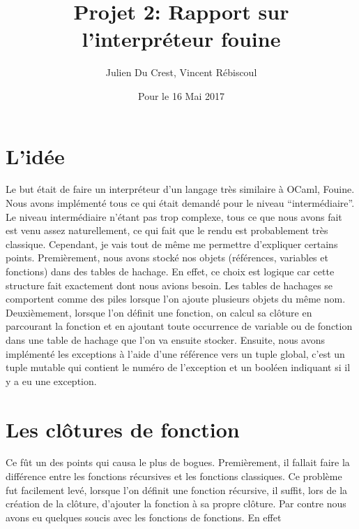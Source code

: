 \documentclass[10pt,a4paper]{article}
\title{Projet 2: Rapport sur l'interpréteur fouine}
\author{Julien Du Crest, Vincent Rébiscoul}
\date{Pour le 16 Mai 2017}
\begin{document}
\maketitle

\section{L'idée}
Le but était de faire un interpréteur d'un langage très similaire à OCaml, Fouine. Nous avons implémenté tous ce qui était demandé pour le niveau ``intermédiaire''. Le niveau intermédiaire n'étant pas trop complexe, tous ce que nous avons fait est venu assez naturellement, ce qui fait que le rendu est probablement très classique. Cependant, je vais tout de même me permettre d'expliquer certains points. Premièrement, nous avons stocké nos objets (références, variables et fonctions) dans des tables de hachage. En effet, ce choix est logique car cette structure fait exactement dont nous avions besoin. Les tables de hachages se comportent comme des piles lorsque l'on ajoute plusieurs objets du même nom. Deuxièmement, lorsque l'on définit une fonction, on calcul sa clôture en parcourant la fonction et en ajoutant toute occurrence de variable ou de fonction dans une table de hachage que l'on va ensuite stocker. Ensuite, nous avons implémenté les exceptions à l'aide d'une référence vers un tuple global, c'est un tuple mutable qui contient le numéro de l'exception et un booléen indiquant si il y a eu une exception. 



\section{Les clôtures de fonction}
Ce fût un des points qui causa le plus de bogues. Premièrement, il fallait faire la différence entre les fonctions récursives et les fonctions classiques. Ce problème fut facilement levé, lorsque l'on définit une fonction récursive, il suffit, lors de la création de la clôture, d'ajouter la fonction à sa propre clôture. Par contre nous avons eu quelques soucis avec les fonctions de fonctions. En effet 
\end{document}

